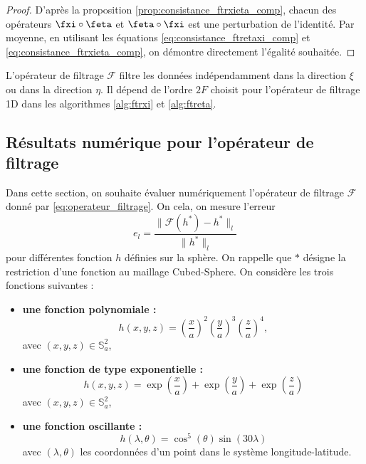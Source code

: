 \begin{proof}
D'après la proposition \ref{prop:consistance_ftrxieta_comp}, chacun des opérateurs $\fxi \circ \feta$ et $\feta \circ \fxi$ est une perturbation de l'identité.
Par moyenne, en utilisant les équations \eqref{eq:consistance_ftretaxi_comp} et \eqref{eq:consistance_ftrxieta_comp}, on démontre directement l'égalité souhaitée.
\end{proof}

L'opérateur de filtrage $\mathcal{F}$ filtre les données indépendamment dans la direction $\xi$ ou dans la direction $\eta$. Il dépend de l'ordre $2F$ choisit pour l'opérateur de filtrage 1D dans les algorithmes \ref{alg:ftrxi} et \ref{alg:ftreta}.














\subsection{Résultats numérique pour l'opérateur de filtrage}

Dans cette section, on souhaite évaluer numériquement l'opérateur de filtrage $\mathcal{F}$ donné par \eqref{eq:operateur_filtrage}. On cela, on mesure l'erreur
\begin{equation}
e_l = \dfrac{\| \mathcal{F}(h^*) - h^* \|_l}{\| h^* \|_l}
\end{equation}
pour différentes fonction $h$ définies sur la sphère. On rappelle que $*$ désigne la restriction d'une fonction au maillage Cubed-Sphere. On considère les trois fonctions suivantes :

\begin{itemize}
\item \textbf{une fonction polynomiale :} 
\begin{equation}
h(x,y,z)=\left( \dfrac{x}{a} \right)^2  \left( \dfrac{y}{a} \right)^3 \left( \dfrac{z}{a} \right)^4,
\label{eq:fct_test1}
\end{equation}
avec $(x,y,z) \in \mathbb{S}_a^2$,

\item \textbf{une fonction de type exponentielle :}
\begin{equation}
h(x,y,z)=\exp \left( \dfrac{x}{a} \right) + \exp \left( \dfrac{y}{a} \right) + \exp \left( \dfrac{z}{a} \right)
\label{eq:fct_test2}
\end{equation}
avec $(x,y,z) \in \mathbb{S}_a^2$,

\item \textbf{une fonction oscillante :}
\begin{equation}
h(\lambda, \theta)= \cos^5 (\theta) \sin ( 30 \lambda)
\label{eq:fct_test3}
\end{equation}
avec $(\lambda, \theta)$ les coordonnées d'un point dans le système longitude-latitude.
\end{itemize}

